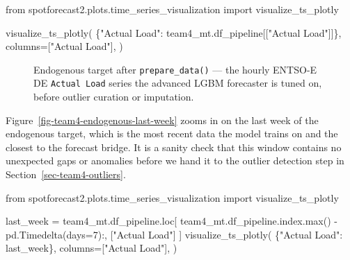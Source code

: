 \documentclass[
  english,
  letterpaper,
]{scrbook}
\newenvironment{Shaded}{\begin{snugshade}}{\end{snugshade}}
\newcommand{\BuiltInTok}[1]{\textcolor[rgb]{0.00,0.23,0.31}{#1}}
\newcommand{\DecValTok}[1]{\textcolor[rgb]{0.68,0.00,0.00}{#1}}
\newcommand{\ImportTok}[1]{\textcolor[rgb]{0.00,0.46,0.62}{#1}}
\newcommand{\NormalTok}[1]{\textcolor[rgb]{0.00,0.23,0.31}{#1}}
\newcommand{\OperatorTok}[1]{\textcolor[rgb]{0.37,0.37,0.37}{#1}}
\newcommand{\StringTok}[1]{\textcolor[rgb]{0.13,0.47,0.30}{#1}}
\begin{document}
\begin{Shaded}
\begin{Highlighting}[]
\ImportTok{from}\NormalTok{ spotforecast2.plots.time\_series\_visualization }\ImportTok{import}\NormalTok{ visualize\_ts\_plotly}

\NormalTok{visualize\_ts\_plotly(}
\NormalTok{    \{}\StringTok{"Actual Load"}\NormalTok{: team4\_mt.df\_pipeline[[}\StringTok{"Actual Load"}\NormalTok{]]\},}
\NormalTok{    columns}\OperatorTok{=}\NormalTok{[}\StringTok{"Actual Load"}\NormalTok{],}
\NormalTok{)}
\end{Highlighting}
\end{Shaded}

\begin{figure}


\caption{\label{fig-team4-endogenous}Endogenous target after
\texttt{prepare\_data()} --- the hourly ENTSO-E DE \texttt{Actual\ Load}
series the advanced LGBM forecaster is tuned on, before outlier curation
or imputation.}

\end{figure}%

Figure~\ref{fig-team4-endogenous-last-week} zooms in on the last week of
the endogenous target, which is the most recent data the model trains on
and the closest to the forecast bridge. It is a sanity check that this
window contains no unexpected gaps or anomalies before we hand it to the
outlier detection step in Section~\ref{sec-team4-outliers}.

\begin{Shaded}
\begin{Highlighting}[]
\ImportTok{from}\NormalTok{ spotforecast2.plots.time\_series\_visualization }\ImportTok{import}\NormalTok{ visualize\_ts\_plotly}

\NormalTok{last\_week }\OperatorTok{=}\NormalTok{ team4\_mt.df\_pipeline.loc[}
\NormalTok{    team4\_mt.df\_pipeline.index.}\BuiltInTok{max}\NormalTok{() }\OperatorTok{{-}}\NormalTok{ pd.Timedelta(days}\OperatorTok{=}\DecValTok{7}\NormalTok{):, [}\StringTok{"Actual Load"}\NormalTok{]}
\NormalTok{]}
\NormalTok{visualize\_ts\_plotly(}
\NormalTok{    \{}\StringTok{"Actual Load"}\NormalTok{: last\_week\},}
\NormalTok{    columns}\OperatorTok{=}\NormalTok{[}\StringTok{"Actual Load"}\NormalTok{],}
\NormalTok{)}
\end{Highlighting}
\end{Shaded}
\end{document}
